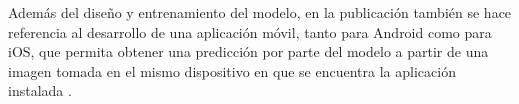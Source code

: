 Además del diseño y entrenamiento del modelo, en la publicación también se hace referencia al desarrollo de una aplicación móvil, tanto para Android como para iOS, que permita obtener una predicción por parte del modelo a partir de una imagen tomada en el mismo dispositivo en que se encuentra la aplicación instalada \cite{soa:mohammad}.